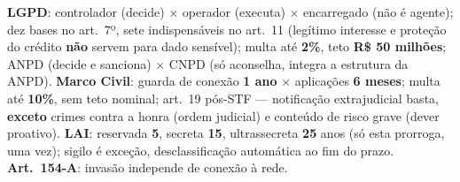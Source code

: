 \begin{regrapratica}
\textbf{LGPD}: controlador (decide) $\times$ operador (executa) $\times$
encarregado (não é agente); dez bases no art.\ 7º, sete indispensáveis no
art.\ 11 (legítimo interesse e proteção do crédito \textbf{não} servem
para dado sensível); multa até \textbf{2\%}, teto \textbf{R\$ 50 milhões};
ANPD (decide e sanciona) $\times$ CNPD (só aconselha, integra a estrutura
da ANPD). \textbf{Marco Civil}: guarda de conexão \textbf{1 ano} $\times$
aplicações \textbf{6 meses}; multa até \textbf{10\%}, sem teto nominal;
art.\ 19 pós-STF --- notificação extrajudicial basta, \textbf{exceto}
crimes contra a honra (ordem judicial) e conteúdo de risco grave (dever
proativo). \textbf{LAI}: reservada \textbf{5}, secreta \textbf{15},
ultrassecreta \textbf{25} anos (só esta prorroga, uma vez); sigilo é
exceção, desclassificação automática ao fim do prazo. \textbf{Art.\
154-A}: invasão independe de conexão à rede.
\end{regrapratica}
